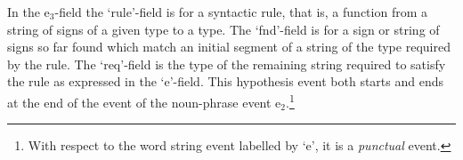 \begin{ex} 
 \end{ex}


In the e$_3$-field the  `rule'-field is for a syntactic rule, that is,
a function from a string of signs of a given type to a type.  The
`fnd'-field is for a sign or string of signs so far found which match an initial
segment of a string of the type required by the rule.  The `req'-field
is the type of the remaining string required to satisfy the rule as
expressed in the `e'-field.  This hypothesis event both starts and
ends at the end of the event of the noun-phrase event
e$_2$.\footnote{With respect to the word string event labelled by `e',
  it is a \textit{punctual} event.} 

